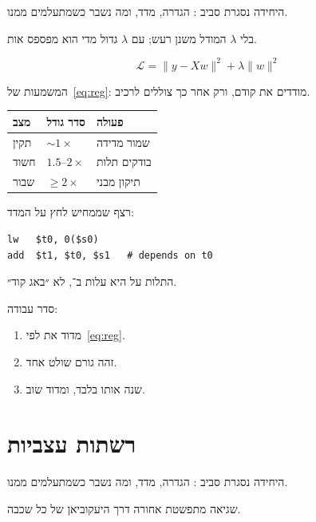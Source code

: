 היחידה נסגרת סביב : הגדרה, מדד, ומה נשבר כשמתעלמים ממנו.

\begin{warnbox}[frametitle={מלכודת — רגולריזציה}]
בלי $\lambda$ המודל משנן רעש; עם $\lambda$ גדול מדי הוא מפספס אות.
\end{warnbox}

\begin{equation}
\label{eq:reg}
\mathcal{L}=\|y-Xw\|^2+\lambda\|w\|^2
\end{equation}

המשמעות של~\eqref{eq:reg}: מודדים את  קודם, ורק אחר כך צוללים לרכיב.

\begin{tablebox}\centering\small
\begin{tabular}{@{}lll@{}}
\toprule
\textbf{מצב} & \textbf{סדר גודל} & \textbf{פעולה}\\
\midrule
תקין & $\sim 1\times$ & שמור מדידה\\
חשוד & $1.5$–$2\times$ & בודקים תלות\\
שבור & $\ge 2\times$ & תיקון מבני\\
\bottomrule
\end{tabular}
\end{tablebox}

רצף שממחיש לחץ על המדד:
\begin{asmblock}
\begin{lstlisting}[style=asm]
lw   $t0, 0($s0)
add  $t1, $t0, $s1   # depends on t0
\end{lstlisting}
\end{asmblock}
התלות על  היא עלות ב־, לא ״באג קוד״.

סדר עבודה:
\begin{enumerate}
\item[(\textbf{א})] מדוד את  לפי~\eqref{eq:reg}.
\item[(\textbf{ב})] זהה גורם שולט אחד.
\item[(\textbf{ג})] שנה אותו בלבד, ומדוד שוב.
\end{enumerate}

\chapter{רשתות עצביות}
\label{ch:nn}

היחידה נסגרת סביב : הגדרה, מדד, ומה נשבר כשמתעלמים ממנו.

\begin{defbox}[frametitle={הגדרה — רשתות עצביות}]
שגיאה מתפשטת אחורה דרך היעקוביאן של כל שכבה.
\end{defbox}

